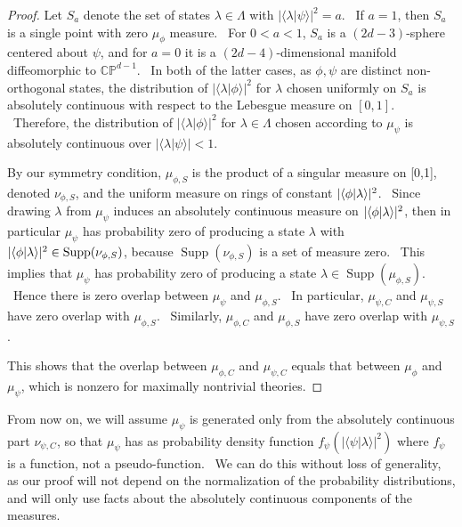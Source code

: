 \documentclass[letterpaper,11pt]{article}
\newcommand{\braket}[2]{\mbox{$ \langle #1 | #2 \rangle $}}
\DeclareMathOperator{\supp}{Supp}
\begin{document}
\begin{proof}
Let $S_a$ denote the set of states $\lambda\in\Lambda$ with $| \langle \lambda | \psi \rangle |^2 = a$. \ If $a=1$, then $S_a$ is a single point with zero $\mu_{\phi}$ measure. \ For $0 < a < 1$, $S_a$ is a $(2d-3)$-sphere centered about $\psi$, and for $a=0$ it is a $(2d-4)$-dimensional manifold diffeomorphic to $\mathbb{CP}^{d-1}$. \ In both of the latter cases, as $\phi,\psi$ are distinct non-orthogonal states, the distribution of $| \langle \lambda | \phi \rangle |^2$ for $\lambda$ chosen uniformly on $S_a$ is absolutely continuous with respect to the Lebesgue measure on $[0,1]$. \ Therefore, the distribution of $| \langle \lambda | \phi \rangle |^2$ for $\lambda\in\Lambda$ chosen according to $\mu_\psi$ is absolutely continuous over $| \langle \lambda | \psi \rangle | < 1$.

By our symmetry condition, $\mu_{\phi,S}$ is the product of a singular measure on [0,1], denoted $\nu_{\phi,S}$, and the uniform measure on rings of constant $|\braket{\phi}{\lambda}|^2$. \ Since drawing $\lambda$ from $\mu_\psi$ induces an absolutely continuous measure on $|\braket{\phi}{\lambda}|^2$, then in particular $\mu_\psi$ has probability zero of producing a state $\lambda$ with $|\braket{\phi}{\lambda}|^2 \in \supp(\nu_{\phi,S})$, because $\supp(\nu_{\phi,S})$ is a set of measure zero. \ This implies that $\mu_\psi$ has probability zero of producing a state $\lambda \in \supp(\mu_{\phi,S})$. \ Hence there is zero overlap between $\mu_\psi$ and $\mu_{\phi,S}$. \ In particular, $\mu_{\psi,C}$ and $\mu_{\psi,S}$ have zero overlap with $\mu_{\phi,S}$. \ Similarly, $\mu_{\phi,C}$ and $\mu_{\phi,S}$ have zero overlap with $\mu_{\psi,S}$.

This shows that the overlap between $\mu_{\phi,C}$ and $\mu_{\psi,C}$ equals that between $\mu_{\phi}$ and $\mu_{\psi}$, which is nonzero for maximally nontrivial theories.
\end{proof}


From now on, we will assume $\mu_\psi$ is generated only from the absolutely
continuous part $\nu_{\psi,C}$, so that $\mu_\psi$ has as probability
density function $f_{\psi}\left(| \langle \psi | \lambda \rangle %
|^2\right)$ where $f_\psi$ is a function, not a pseudo-function. \ We can do
this without loss of generality, as our proof will not depend on the
normalization of the probability distributions, and will only use facts
about the absolutely continuous components of the measures.
\end{document}
